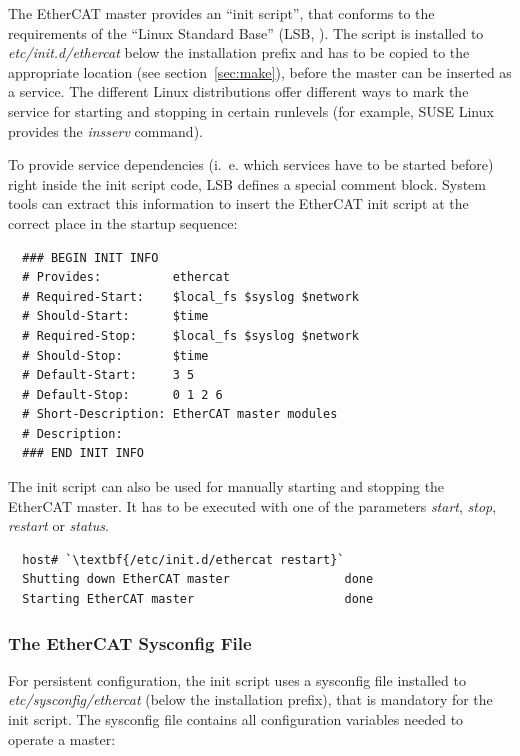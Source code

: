 \documentclass[a4paper,12pt,BCOR6mm,bibtotoc,idxtotoc]{scrbook}
\begin{document}
The EtherCAT master provides an ``init script'', that conforms to the
requirements of the ``Linux Standard Base'' (LSB,
\cite{lsb}). The script is installed to \textit{etc/init.d/ethercat}
below the installation prefix and has to be copied to the appropriate
location (see section~\ref{sec:make}), before the master can be
inserted as a service. The different Linux distributions offer
different ways to mark the service for starting and stopping in
certain runlevels (for example, SUSE Linux provides the
\textit{insserv} command).

To provide service dependencies (i.~e. which services have to be
started before) right inside the init script code, LSB defines a
special comment block. System tools can extract this information to
insert the EtherCAT init script at the correct place in the startup
sequence:

\begin{lstlisting}
  ### BEGIN INIT INFO
  # Provides:          ethercat
  # Required-Start:    $local_fs $syslog $network
  # Should-Start:      $time
  # Required-Stop:     $local_fs $syslog $network
  # Should-Stop:       $time
  # Default-Start:     3 5
  # Default-Stop:      0 1 2 6
  # Short-Description: EtherCAT master modules
  # Description:
  ### END INIT INFO
\end{lstlisting}

The init script can also be used for manually starting and stopping
the EtherCAT master. It has to be executed with one of the parameters
\textit{start}, \textit{stop}, \textit{restart} or \textit{status}.

\begin{lstlisting}
  host# `\textbf{/etc/init.d/ethercat restart}`
  Shutting down EtherCAT master                done
  Starting EtherCAT master                     done
\end{lstlisting}

\subsubsection{The EtherCAT Sysconfig File}
\label{sec:sysconfig}

For persistent configuration, the init script uses a sysconfig file
installed to \textit{etc/sysconfig/ethercat} (below the installation
prefix), that is mandatory for the init script. The sysconfig file
contains all configuration variables needed to operate a master:
\end{document}
